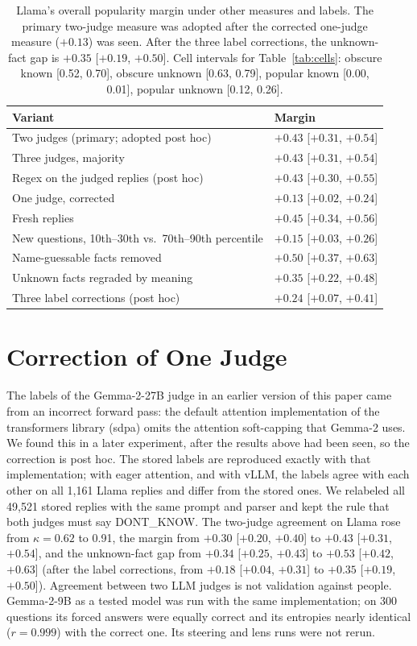 \documentclass[letterpaper]{article} %
\begin{document}
\begin{table}[!ht]
\centering
\small
\begin{tabular}{@{}p{}l@{}}
\toprule
Variant & Margin \\
\midrule
Two judges (primary; adopted post hoc) & $+0.43$ [$+0.31$, $+0.54$] \\
Three judges, majority & $+0.43$ [$+0.31$, $+0.54$] \\
Regex on the judged replies (post hoc) & $+0.43$ [$+0.30$, $+0.55$] \\
One judge, corrected & $+0.13$ [$+0.02$, $+0.24$] \\
Fresh replies & $+0.45$ [$+0.34$, $+0.56$] \\
New questions, 10th--30th vs.\ 70th--90th percentile & $+0.15$ [$+0.03$, $+0.26$] \\
Name-guessable facts removed & $+0.50$ [$+0.37$, $+0.63$] \\
Unknown facts regraded by meaning & $+0.35$ [$+0.22$, $+0.48$] \\
Three label corrections (post hoc) & $+0.24$ [$+0.07$, $+0.41$] \\
\bottomrule
\end{tabular}
\caption{Llama's overall popularity margin under other measures and labels. The primary two-judge measure was adopted after the corrected one-judge measure ($+0.13$) was seen. After the three label corrections, the unknown-fact gap is $+0.35$ [$+0.19$, $+0.50$]. Cell intervals for Table~\ref{tab:cells}: obscure known [0.52, 0.70], obscure unknown [0.63, 0.79], popular known [0.00, 0.01], popular unknown [0.12, 0.26].}
\label{tab:robust}
\end{table}

\section{Correction of One Judge}
\label{app:judge}

The labels of the Gemma-2-27B judge in an earlier version of this paper came from an incorrect forward pass: the default attention implementation of the transformers library (sdpa) omits the attention soft-capping that Gemma-2 uses. We found this in a later experiment, after the results above had been seen, so the correction is post hoc. The stored labels are reproduced exactly with that implementation; with eager attention, and with vLLM, the labels agree with each other on all 1,161 Llama replies and differ from the stored ones. We relabeled all 49,521 stored replies with the same prompt and parser and kept the rule that both judges must say DONT\_KNOW. The two-judge agreement on Llama rose from $\kappa = 0.62$ to 0.91, the margin from $+0.30$ [$+0.20$, $+0.40$] to $+0.43$ [$+0.31$, $+0.54$], and the unknown-fact gap from $+0.34$ [$+0.25$, $+0.43$] to $+0.53$ [$+0.42$, $+0.63$] (after the label corrections, from $+0.18$ [$+0.04$, $+0.31$] to $+0.35$ [$+0.19$, $+0.50$]). Agreement between two LLM judges is not validation against people. Gemma-2-9B as a tested model was run with the same implementation; on 300 questions its forced answers were equally correct and its entropies nearly identical ($r = 0.999$) with the correct one. Its steering and lens runs were not rerun.
\end{document}
